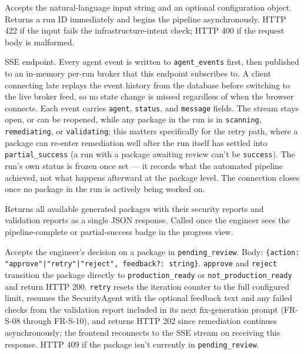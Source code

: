 \begin{description}[leftmargin=3cm, style=nextline]
  \item[\texttt{POST /api/pipeline/run}]
    Accepts the natural-language input string and an optional configuration
    object. Returns a run ID immediately and begins the pipeline
    asynchronously. HTTP 422 if the input fails the infrastructure-intent
    check; HTTP 400 if the request body is malformed.

  \item[\texttt{GET /api/pipeline/\{run\_id\}/stream}]
    SSE endpoint. Every agent event is written to \texttt{agent\_events}
    first, then published to an in-memory per-run broker that this
    endpoint subscribes to. A client connecting late replays the event
    history from the database before switching to the live broker feed,
    so no state change is missed regardless of when the browser connects.
    Each event carries \texttt{agent}, \texttt{status}, and
    \texttt{message} fields. The stream stays open, or can be reopened,
    while any package in the run is in \texttt{scanning},
    \texttt{remediating}, or \texttt{validating}; this matters
    specifically for the retry path, where a package can re-enter
    remediation well after the run itself has settled into
    \texttt{partial\_success} (a run with a package awaiting review can't
    be \texttt{success}). The run's own status
    is frozen once set --- it records what the automated pipeline
    achieved, not what happens afterward at the package level. The
    connection closes once no package in the run is actively being
    worked on.

  \item[\texttt{GET /api/pipeline/\{run\_id\}/results}]
    Returns all available generated packages with their security reports and
    validation reports as a single JSON response. Called once the
    engineer sees the pipeline-complete or partial-success badge in the
    progress view.

  \item[\texttt{POST /api/pipeline/\{run\_id\}/packages/\{variant\}/review}]
    Accepts the engineer's decision on a package in
    \texttt{pending\_review}. Body: \texttt{\{action:
    "approve"|"retry"|"reject", feedback?: string\}}.
    \texttt{approve} and \texttt{reject} transition the package directly
    to \texttt{production\_ready} or \texttt{not\_production\_ready} and
    return HTTP 200. \texttt{retry} resets the iteration counter to the
    full configured limit, resumes the SecurityAgent with the optional
    feedback text and any failed checks from the validation report
    included in its next fix-generation prompt (FR-S-08
    through FR-S-10), and returns HTTP 202 since remediation continues
    asynchronously; the frontend reconnects to the SSE stream on
    receiving this response. HTTP 409 if the package isn't currently in
    \texttt{pending\_review}.


\end{description}
